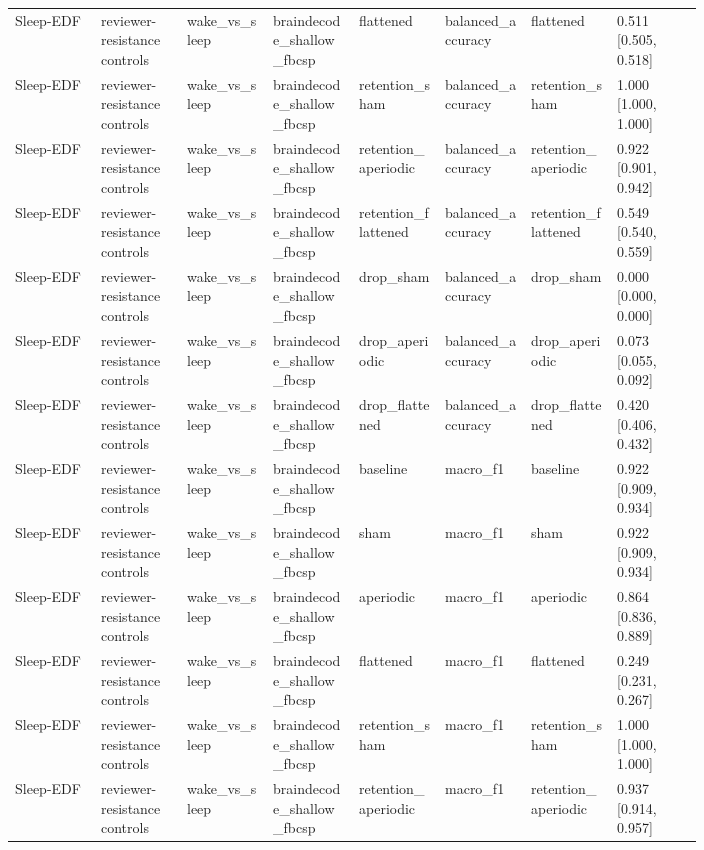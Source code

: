 \begin{longtable}{p{0.10\linewidth}p{0.10\linewidth}p{0.10\linewidth}p{0.10\linewidth}p{0.10\linewidth}p{0.10\linewidth}p{0.10\linewidth}p{0.10\linewidth}}
Sleep-EDF & reviewer-resistance controls & wake\_vs\_sleep & braindecode\_shallow\_fbcsp & flattened & balanced\_accuracy & flattened & 0.511 [0.505, 0.518]\\
Sleep-EDF & reviewer-resistance controls & wake\_vs\_sleep & braindecode\_shallow\_fbcsp & retention\_sham & balanced\_accuracy & retention\_sham & 1.000 [1.000, 1.000]\\
Sleep-EDF & reviewer-resistance controls & wake\_vs\_sleep & braindecode\_shallow\_fbcsp & retention\_aperiodic & balanced\_accuracy & retention\_aperiodic & 0.922 [0.901, 0.942]\\
Sleep-EDF & reviewer-resistance controls & wake\_vs\_sleep & braindecode\_shallow\_fbcsp & retention\_flattened & balanced\_accuracy & retention\_flattened & 0.549 [0.540, 0.559]\\
Sleep-EDF & reviewer-resistance controls & wake\_vs\_sleep & braindecode\_shallow\_fbcsp & drop\_sham & balanced\_accuracy & drop\_sham & 0.000 [0.000, 0.000]\\
Sleep-EDF & reviewer-resistance controls & wake\_vs\_sleep & braindecode\_shallow\_fbcsp & drop\_aperiodic & balanced\_accuracy & drop\_aperiodic & 0.073 [0.055, 0.092]\\
Sleep-EDF & reviewer-resistance controls & wake\_vs\_sleep & braindecode\_shallow\_fbcsp & drop\_flattened & balanced\_accuracy & drop\_flattened & 0.420 [0.406, 0.432]\\
Sleep-EDF & reviewer-resistance controls & wake\_vs\_sleep & braindecode\_shallow\_fbcsp & baseline & macro\_f1 & baseline & 0.922 [0.909, 0.934]\\
Sleep-EDF & reviewer-resistance controls & wake\_vs\_sleep & braindecode\_shallow\_fbcsp & sham & macro\_f1 & sham & 0.922 [0.909, 0.934]\\
Sleep-EDF & reviewer-resistance controls & wake\_vs\_sleep & braindecode\_shallow\_fbcsp & aperiodic & macro\_f1 & aperiodic & 0.864 [0.836, 0.889]\\
Sleep-EDF & reviewer-resistance controls & wake\_vs\_sleep & braindecode\_shallow\_fbcsp & flattened & macro\_f1 & flattened & 0.249 [0.231, 0.267]\\
Sleep-EDF & reviewer-resistance controls & wake\_vs\_sleep & braindecode\_shallow\_fbcsp & retention\_sham & macro\_f1 & retention\_sham & 1.000 [1.000, 1.000]\\
Sleep-EDF & reviewer-resistance controls & wake\_vs\_sleep & braindecode\_shallow\_fbcsp & retention\_aperiodic & macro\_f1 & retention\_aperiodic & 0.937 [0.914, 0.957]\\

\end{longtable}
